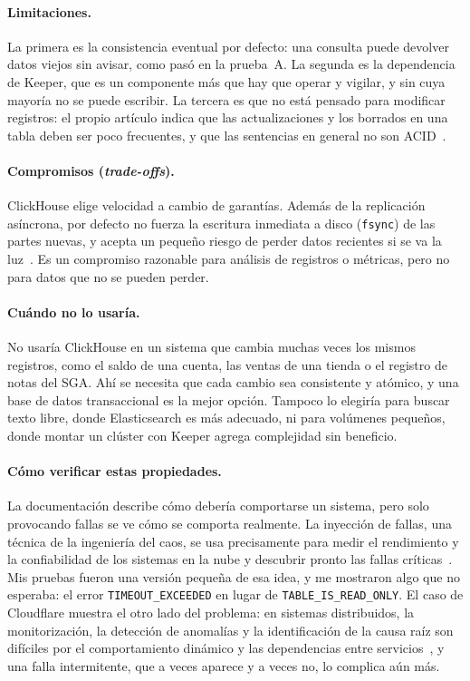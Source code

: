 \documentclass[12pt,a4paper]{article}
\begin{document}
\paragraph{Limitaciones.} La primera es la consistencia eventual por
defecto: una consulta puede devolver datos viejos sin avisar, como pasó
en la prueba~A. La segunda es la dependencia de Keeper, que es un
componente más que hay que operar y vigilar, y sin cuya mayoría no se
puede escribir. La tercera es que no está pensado para modificar
registros: el propio artículo indica que las actualizaciones y los
borrados en una tabla deben ser poco frecuentes, y que las sentencias en
general no son ACID~\cite[p.~3736]{schulze2024}.

\paragraph{Compromisos (\emph{trade-offs}).} ClickHouse elige velocidad a
cambio de garantías. Además de la replicación asíncrona, por defecto no
fuerza la escritura inmediata a disco (\texttt{fsync}) de las partes
nuevas, y acepta un pequeño riesgo de perder datos recientes si se va la
luz~\cite[p.~3736]{schulze2024}. Es un compromiso razonable para
análisis de registros o métricas, pero no para datos que no se pueden
perder.

\paragraph{Cuándo no lo usaría.} No usaría ClickHouse en un sistema que
cambia muchas veces los mismos registros, como el saldo de una cuenta,
las ventas de una tienda o el registro de notas del SGA. Ahí se necesita
que cada cambio sea consistente y atómico, y una base de datos
transaccional es la mejor opción. Tampoco lo elegiría para buscar texto
libre, donde Elasticsearch es más adecuado, ni para volúmenes pequeños,
donde montar un clúster con Keeper agrega complejidad sin beneficio.

\paragraph{Cómo verificar estas propiedades.} La documentación describe
cómo debería comportarse un sistema, pero solo provocando fallas se ve
cómo se comporta realmente. La inyección de fallas, una técnica de la
ingeniería del caos, se usa precisamente para medir el rendimiento y la
confiabilidad de los sistemas en la nube y descubrir pronto las fallas
críticas~\cite[p.~2389]{alsaidahmad2024}. Mis pruebas fueron una versión
pequeña de esa idea, y me mostraron algo que no esperaba: el error
\texttt{TIMEOUT\_EXCEEDED} en lugar de \texttt{TABLE\_IS\_READ\_ONLY}. El
caso de Cloudflare muestra el otro lado del problema: en sistemas
distribuidos, la monitorización, la detección de anomalías y la
identificación de la causa raíz son difíciles por el comportamiento
dinámico y las dependencias entre servicios~\cite[p.~1]{barata2026}, y
una falla intermitente, que a veces aparece y a veces no, lo complica
aún más.
\end{document}
